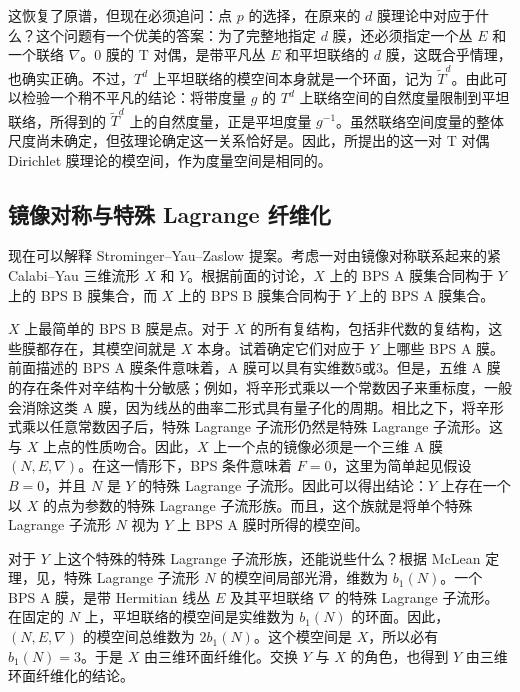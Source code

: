 这恢复了原谱，但现在必须追问：点 $p$ 的选择，在原来的 $d$ 膜理论中对应于什么？这个问题有一个优美的答案：为了完整地指定 $d$ 膜，还必须指定一个丛 $E$ 和一个联络 $\nabla$。$0$ 膜的 T 对偶，是带平凡丛 $E$ 和平坦联络的 $d$ 膜，这既合乎情理，也确实正确。不过，$T^d$ 上平坦联络的模空间本身就是一个环面，记为 $\widetilde{T}^d$。由此可以检验一个稍不平凡的结论：将带度量 $g$ 的 $T^d$ 上联络空间的自然度量限制到平坦联络，所得到的 $\widetilde{T}^d$ 上的自然度量，正是平坦度量 $g^{-1}$。虽然联络空间度量的整体尺度尚未确定，但弦理论确定这一关系恰好是。因此，所提出的这一对 T 对偶 Dirichlet 膜理论的模空间，作为度量空间是相同的。

\subsection{镜像对称与特殊 Lagrange 纤维化}\label{sec:1.3.2}

现在可以解释 Strominger--Yau--Zaslow 提案。考虑一对由镜像对称联系起来的紧 Calabi--Yau 三维流形 $X$ 和 $Y$。根据前面的讨论，$X$ 上的 BPS A 膜集合同构于 $Y$ 上的 BPS B 膜集合，而 $X$ 上的 BPS B 膜集合同构于 $Y$ 上的 BPS A 膜集合。

$X$ 上最简单的 BPS B 膜是点。对于 $X$ 的所有复结构，包括非代数的复结构，这些膜都存在，其模空间就是 $X$ 本身。试着确定它们对应于 $Y$ 上哪些 BPS A 膜。前面描述的 BPS A 膜条件意味着，A 膜可以具有实维数5或3。但是，五维 A 膜的存在条件对辛结构十分敏感；例如，将辛形式乘以一个常数因子来重标度，一般会消除这类 A 膜，因为线丛的曲率二形式具有量子化的周期。相比之下，将辛形式乘以任意常数因子后，特殊 Lagrange 子流形仍然是特殊 Lagrange 子流形。这与 $X$ 上点的性质吻合。因此，$X$ 上一个点的镜像必须是一个三维 A 膜 $(N,E,\nabla)$。在这一情形下，BPS 条件意味着 $F=0$，这里为简单起见假设 $B=0$，并且 $N$ 是 $Y$ 的特殊 Lagrange 子流形。因此可以得出结论：$Y$ 上存在一个以 $X$ 的点为参数的特殊 Lagrange 子流形族。而且，这个族就是将单个特殊 Lagrange 子流形 $N$ 视为 $Y$ 上 BPS A 膜时所得的模空间。

对于 $Y$ 上这个特殊的特殊 Lagrange 子流形族，还能说些什么？根据 McLean 定理，见，特殊 Lagrange 子流形 $N$ 的模空间局部光滑，维数为 $b_1(N)$。一个 BPS A 膜，是带 Hermitian 线丛 $E$ 及其平坦联络 $\nabla$ 的特殊 Lagrange 子流形。在固定的 $N$ 上，平坦联络的模空间是实维数为 $b_1(N)$ 的环面。因此，$(N,E,\nabla)$ 的模空间总维数为 $2b_1(N)$。这个模空间是 $X$，所以必有 $b_1(N)=3$。于是 $X$ 由三维环面纤维化。交换 $Y$ 与 $X$ 的角色，也得到 $Y$ 由三维环面纤维化的结论。

